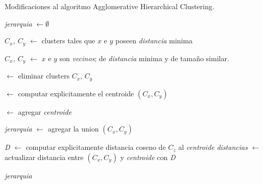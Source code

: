\settowidth{}
\addtolength\mylen{\parindent}

\begin{algorithm}[h]
\caption{Modificaciones al algoritmo Agglomerative Hierarchical Clustering.}
\label{alg:morenoahc}
\begin{algorithmic}[1]

                      
    \State \emph{jerarquia} $\gets \emptyset$
                      


        \State \emph{$C_x$, $C_y$} $\gets$ clusters tales que $x$ e $y$
                                           poseen \emph{distancia}
                                           minima      
            
    \Else{}

        \State \emph{$C_x$, $C_y$} $\gets$ $x$ e $y$ son \emph{vecinos}; 
                                   de \emph{distancia} minima y de tama\~no
                                   similar.

    \EndIf
    
     $\gets$ eliminar clusters $C_x$, $C_y$

     $\gets$ computar explicitamente el centroide $(C_x,C_y)$ 

     $\gets$ agregar \emph{centroide}
    
    \State \emph{jerarquia} $\gets$ agregar la union $(C_x,C_y)$
    
        \State \emph{D} $\gets$ computar explicitamente distancia coseno
                                de $C_z$ al \emph{centroide}
        \State \emph{distancias} $\gets$ actualizar distancia entre
                                         $(C_x,C_y)$ y \emph{centroide}
                                         con \emph{D}
    \EndFor            
    
\EndFor

\State \Return \emph{jerarquia} 
 
\EndProcedure 

\end{algorithmic}
\end{algorithm}


